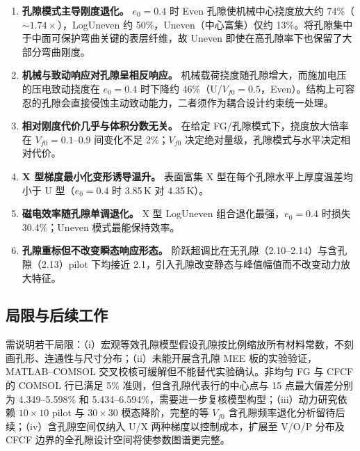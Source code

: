 \documentclass[11pt,a4paper]{ctexart}
\begin{document}
\begin{enumerate}[leftmargin=2em]
\item \textbf{孔隙模式主导刚度退化。} $e_0=0.4$ 时 Even 孔隙使机械中心挠度放大约 74\%（$\sim1.74\times$），LogUneven 约 50\%，Uneven（中心富集）仅约 13\%。将孔隙集中于中面可保护弯曲关键的表层纤维，故 Uneven 即使在高孔隙率下也保留了大部分弯曲刚度。

\item \textbf{机械与致动响应对孔隙呈相反响应。} 机械载荷挠度随孔隙增大，而施加电压的压电致动挠度在 $e_0=0.4$ 时下降约 46\%（U/$V_{f0}=0.5$，Even）。结构上可容忍的孔隙会直接侵蚀主动致动能力，二者须作为耦合设计约束统一处理。

\item \textbf{相对刚度代价几乎与体积分数无关。} 在给定 FG/孔隙模式下，挠度放大倍率在 $V_{f0}=0.1$--$0.9$ 间变化不足 2\%；$V_{f0}$ 决定绝对量级，孔隙模式与水平决定相对代价。

\item \textbf{X 型梯度最小化变形诱导温升。} 表面富集 X 型在每个孔隙水平上厚度温差均小于 U 型（$e_0=0.4$ 时 3.85\,K 对 4.35\,K）。

\item \textbf{磁电效率随孔隙单调退化。} X 型 LogUneven 组合退化最强，$e_0=0.4$ 时损失 30.4\%；Uneven 模式最能保持效率。

\item \textbf{孔隙重标但不改变瞬态响应形态。} 阶跃超调比在无孔隙（2.10--2.14）与含孔隙（2.13）pilot 下均接近 2.1，引入孔隙改变静态与峰值幅值而不改变动力放大特征。
\end{enumerate}

\subsection*{局限与后续工作}

需说明若干局限：（i）宏观等效孔隙模型假设孔隙按比例缩放所有材料常数，不刻画孔形、连通性与尺寸分布；（ii）未能开展含孔隙 MEE 板的实验验证，MATLAB--COMSOL 交叉校核可缓解但不能替代实验确认。非均匀 FG 与 CFCF 的 COMSOL 行已满足 5\% 准则，但含孔隙代表行的中心点与 15 点最大偏差分别为 4.349--5.598\% 和 5.434--6.594\%，需要进一步复核模型构型；（iii）动力研究依赖 $10\times10$ pilot 与 $30\times30$ 模态降阶，完整的等 $V_{f0}$ 含孔隙频率退化分析留待后续；（iv）含孔隙空间仅纳入 U/X 两种梯度以控制成本，扩展至 V/O/P 分布及 CFCF 边界的全孔隙设计空间将使参数图谱更完整。
\end{document}
